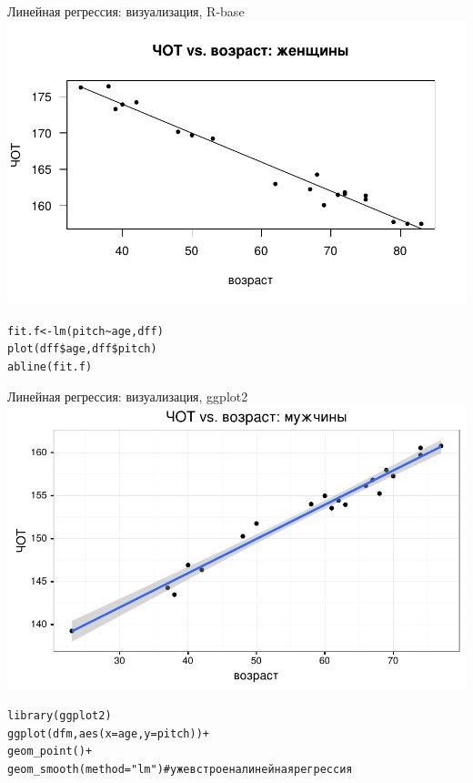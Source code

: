 \begin{frame}{Линейная регрессия: визуализация, R-base}
\includegraphics[width=\linewidth]{linearbaser.pdf}
\scriptsize
\begin{alltt}
fit.f <- lm(pitch\textasciitilde  age, dff)\\
plot(dff\$age, dff\$pitch)\\
abline(fit.f)
\end{alltt}
\normalsize
\end{frame}
\begin{frame}{Линейная регрессия: визуализация, ggplot2}
\includegraphics[width=0.95\linewidth]{linearggplot.pdf}
\scriptsize
\begin{alltt}
library(ggplot2)\\
ggplot(dfm, aes(x=age, y = pitch))+\\
  geom\_point()+\\
\alert{geom\_smooth(method = "lm") \hfill \# уже встроена линейная регрессия}\\
\end{alltt}
\normalsize
\end{frame}
